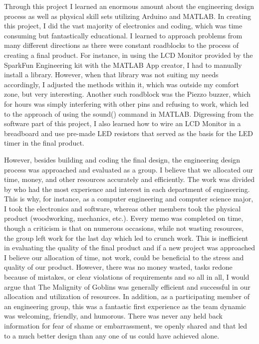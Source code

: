 \documentclass[conference]{IEEEtran}
\begin{document}
\par Through this project I learned an enormous amount about the engineering design process as well as physical skill sets utilizing Arduino and MATLAB. In creating this project, I did the vast majority of electronics and coding, which was time consuming but fantastically educational. I learned to approach problems from many different directions as there were constant roadblocks to the process of creating a final product. For instance, in using the LCD Monitor provided by the SparkFun Engineering kit with the MATLAB App creator, I had to manually install a library. However, when that library was not suiting my needs accordingly, I adjusted the methods within it, which was outside my comfort zone, but very interesting. Another such roadblock was the Piezzo buzzer, which for hours was simply interfering with other pins and refusing to work, which led to the approach of using the sound() command in MATLAB. Digressing from the software part of this project, I also learned how to wire an LCD Monitor in a breadboard and use pre-made LED resistors that served as the basis for the LED timer in the final product. 
\par However, besides building and coding the final design, the engineering design process was approached and evaluated as a group. I believe that we allocated our time, money, and other resources accurately and efficiently. The work was divided by who had the most experience and interest in each department of engineering. This is why, for instance, as a computer engineering and computer science major, I took the electronics and software, whereas other members took the physical product (woodworking, mechanics, etc.). Every memo was completed on time, though a criticism is that on numerous occasions, while not wasting resources, the group left work for the last day which led to crunch work. This is inefficient in evaluating the quality of the final product and if a new project was approached I believe our allocation of time, not work, could be beneficial to the stress and quality of our product. However, there was no money wasted, tasks redone because of mistakes, or clear violations of requirements and so all in all, I would argue that The Malignity of Goblins was generally efficient and successful in our allocation and utilization of resources. In addition, as a participating member of an engineering group, this was a fantastic first experience as the team dynamic was welcoming, friendly, and humorous. There was never any held back information for fear of shame or embarrassment, we openly shared and that led to a much better design than any one of us could have achieved alone.
\end{document}
